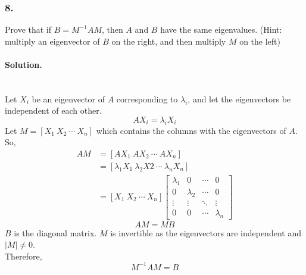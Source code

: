 \subsubsection{8.} Prove that if $B = M^{-1}AM$, then $A$ and $B$ have the same eigenvalues. (Hint: multiply an eigenvector of $B$ on the right, and then multiply $M$ on the left)
\paragraph{Solution.}\phantom{}\\
Let $X_i$ be an eigenvector of $A$ corresponding to $\lambda_i$, and let the eigenvectors be independent of each other.
$$AX_i=\lambda_i X_i$$
Let $M=[X_1\ X_2\ \cdots\ X_n]$ which contains the columns with the eigenvectors of $A$.\\
So,
\begin{align*}
    AM &= [AX_1\ AX_2\ \cdots\ AX_n]\\
    &=[\lambda_1X_1\ \lambda_2 X2\ \cdots\ \lambda_nX_n]\\
    &=[X_1\ X_2\ \cdots\ X_n]\begin{bmatrix}
        \lambda_1 & 0 & \cdots & 0\\
        0 & \lambda_2 & \cdots & 0\\
        \vdots & \vdots & \ddots & \vdots\\
        0 & 0 & \cdots & \lambda_n
    \end{bmatrix}
\end{align*}
$$AM=MB$$
$B$ is the diagonal matrix. $M$ is invertible as the eigenvectors are independent and $|M|\neq 0$.\\
Therefore, $$M^{-1}AM=B$$

